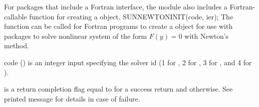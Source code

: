 For {\sundials} packages that include a Fortran interface, the
{\sunnonlinsolnewton} module also includes a Fortran-callable
function for creating a  object.
{
  SUNNEWTONINIT(code, ier);
}
{
  The function  can be called for Fortran programs
  to create a  object for use with {\sundials}
  packages to solve nonlinear system of the form $F(y) = 0$ with
  Newton's method.
}
{
  \begin{args}[code]
  \item[code] ()
    is an integer input specifying the solver id (1 for {\cvode}, 2
    for {\ida}, 3 for {\kinsol}, and 4 for {\arkode}).
  \end{args}
}
{
   is a return completion flag equal to  for a success
  return and  otherwise. See printed message for details in case
  of failure.
}
{}

